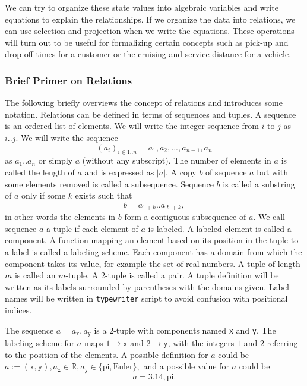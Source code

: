 We can try to organize these state values into algebraic variables and write
equations to explain the relationships. If we organize the data into
relations, we can use selection and projection when we write the
equations. These operations will turn out to be useful for formalizing certain
concepts such as pick-up and drop-off times for a customer or the cruising and
service distance for a vehicle.

\begin{mdframed}
\small
\subsubsection*{Brief Primer on Relations}
The following briefly overviews the concept of relations and introduces some
notation.  Relations can be defined in terms of sequences and tuples.  A
sequence is an ordered list of elements.  We will write the integer sequence
from $i$ to $j$ as $i..j$. We will write the sequence $$(a_i)_{i\in
1..n}=a_1,a_2,...,a_{n-1},a_n$$ as $a_1..a_n$ or simply $a$ (without any
subscript). The number of elements in $a$ is called the length of $a$ and is
expressed as $|a|$.  A copy $b$ of sequence $a$ but with some elements removed
is called a subsequence.  Sequence $b$ is called a substring of $a$ only if
some $k$ exists such that $$b=a_{1+k}..a_{|b|+k},$$ in other words the elements
in $b$ form a contiguous subsequence of $a$.  We call sequence $a$ a tuple if
each element of $a$ is labeled. A labeled element is called a component.  A
function mapping an element based on its position in the tuple to a label is
called a labeling scheme.  Each component has a domain from which the component
takes its value, for example the set of real numbers.  A tuple of length $m$ is
called an $m$-tuple. A 2-tuple is called a pair.  A tuple definition will be
written as its labels surrounded by parentheses with the domains given. Label
names will be written in \texttt{typewriter} script to avoid confusion with
positional indices.

\begin{example}
\label{ex:tuple}
The sequence $a=a_\texttt{x},a_\texttt{y}$
is a 2-tuple with components named \texttt{x} and \texttt{y}.
The labeling
scheme for $a$ maps $1\rightarrow \texttt{x}$ and $2\rightarrow \texttt{y}$, with the
integers $1$ and $2$ referring to the position of the elements. A possible definition for
$a$ could be $a:=(\texttt{x},\texttt{y}),
a_\texttt{x}\in\mathbb{R}, a_\texttt{y}\in\{\textrm{pi},\textrm{Euler}\},$ and
a possible value for $a$ could be $$a=3.14,\textrm{pi}.$$
\end{example}


\end{mdframed}
